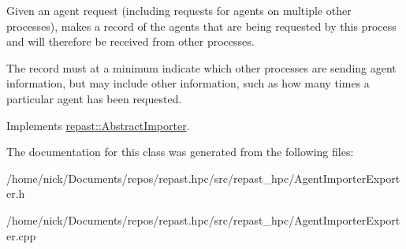 Given an agent request (including requests for agents on multiple other processes), makes a record of the agents that are being requested by this process and will therefore be received from other processes. 

The record must at a minimum indicate which other processes are sending agent information, but may include other information, such as how many times a particular agent has been requested. 

Implements \hyperlink{classrepast_1_1_abstract_importer_a1353cfde773ce5b3e7011571aff1f823}{repast\-::\-Abstract\-Importer}.



The documentation for this class was generated from the following files\-:\begin{DoxyCompactItemize}
\item 
/home/nick/\-Documents/repos/repast.\-hpc/src/repast\-\_\-hpc/Agent\-Importer\-Exporter.\-h\item 
/home/nick/\-Documents/repos/repast.\-hpc/src/repast\-\_\-hpc/Agent\-Importer\-Exporter.\-cpp\end{DoxyCompactItemize}
